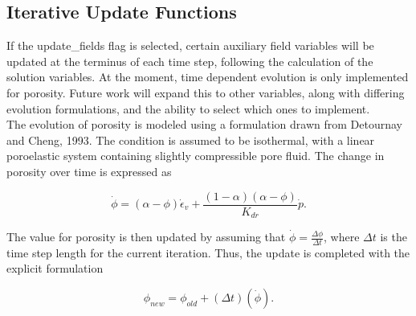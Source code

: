 \subsection{Iterative Update Functions}

If the update\_fields flag is selected, certain auxiliary field variables will be updated at the terminus
of each time step, following the calculation of the solution variables. At the moment, time dependent
evolution is only implemented for porosity. Future work will expand this to other variables, along with
differing evolution formulations, and the ability to select which ones to implement.\\

The evolution of porosity is modeled using a formulation drawn from Detournay and Cheng, 1993. The
condition is assumed to be isothermal, with a linear poroelastic system containing slightly compressible
pore fluid. The change in porosity over time is expressed as

\begin{equation}
    \dot{\phi} = \left(\alpha - \phi\right)\dot{\epsilon}_{v} + \frac{\left(1 - \alpha\right)\left(\alpha - \phi\right)}{K_{dr}} \dot{p}.
\end{equation}

The value for porosity is then updated by assuming that $\dot{\phi} = \frac{\Delta \phi}{\Delta t}$, where $\Delta t$ is the time step
length for the current iteration. Thus, the update is completed with the explicit formulation

\begin{equation}
    \phi_{new} = \phi_{old} + \left(\Delta t\right) \left(\dot{\phi}\right).
\end{equation}
